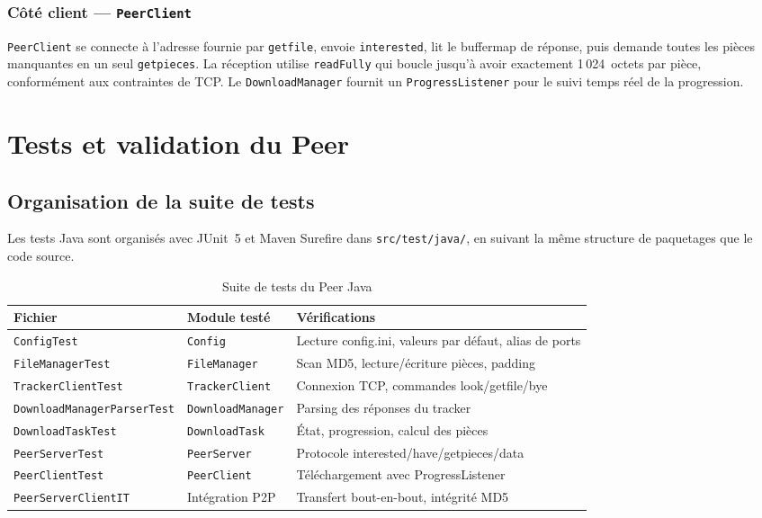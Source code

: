 \documentclass[11pt, a4paper]{article}
\begin{document}
\subsubsection{Côté client --- \texttt{PeerClient}}

\texttt{PeerClient} se connecte à l'adresse fournie par \texttt{getfile},
envoie \texttt{interested}, lit le buffermap de réponse, puis demande
toutes les pièces manquantes en un seul \texttt{getpieces}.
La réception utilise \texttt{readFully} qui boucle jusqu'à avoir exactement
1\,024~octets par pièce, conformément aux contraintes de TCP.
Le \texttt{DownloadManager} fournit un \texttt{ProgressListener} pour le
suivi temps réel de la progression.

\section{Tests et validation du Peer}

\subsection{Organisation de la suite de tests}

Les tests Java sont organisés avec JUnit~5 et Maven Surefire dans
\texttt{src/test/java/}, en suivant la même structure de paquetages que
le code source.

\begin{table}[H]
\centering
\begin{tabular}{llp{5cm}}
\toprule
\textbf{Fichier} & \textbf{Module testé} & \textbf{Vérifications} \\
\midrule
\texttt{ConfigTest}                & \texttt{Config}          & Lecture config.ini, valeurs par défaut, alias de ports \\
\texttt{FileManagerTest}           & \texttt{FileManager}     & Scan MD5, lecture/écriture pièces, padding \\
\texttt{TrackerClientTest}         & \texttt{TrackerClient}   & Connexion TCP, commandes look/getfile/bye \\
\texttt{DownloadManagerParserTest} & \texttt{DownloadManager} & Parsing des réponses du tracker \\
\texttt{DownloadTaskTest}          & \texttt{DownloadTask}    & État, progression, calcul des pièces \\
\texttt{PeerServerTest}            & \texttt{PeerServer}      & Protocole interested/have/getpieces/data \\
\texttt{PeerClientTest}            & \texttt{PeerClient}      & Téléchargement avec ProgressListener \\
\texttt{PeerServerClientIT}        & Intégration P2P           & Transfert bout-en-bout, intégrité MD5 \\
\bottomrule
\end{tabular}
\caption{Suite de tests du Peer Java}
\end{table}
\end{document}
